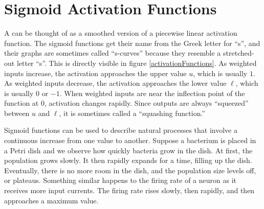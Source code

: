 \section{Sigmoid Activation Functions}


A  can be thought of as a smoothed version of a piecewise linear activation function. The sigmoid functions get their name from the Greek letter for ``s'', and their graphs are sometimes called ``s-curves'' because they resemble a stretched-out letter ``s''. This is directly visible in figure \ref{activationFunctions}. As weighted inputs increase, the activation approaches the upper value $u$, which is usually $1$. As weighted inputs decrease, the activation approaches the lower value $\ell$, which is usually $0$ or $-1$. When weighted inputs are near the inflection point of the function at 0, activation changes rapidly. Since outputs are always ``squeezed'' between $u$ and $\ell$, it is sometimes called a ``squashing function.''

  Sigmoid functions can be used to describe natural processes that involve a continuous increase from one value to another. Suppose a bacterium is placed in a Petri dish and we observe how quickly bacteria grow in the dish. At first, the population grows slowly. It then rapidly expands for a time, filling up the dish. Eventually, there is no more room in the dish, and the population size levels off, or plateaus. Something similar happens to the firing rate of a neuron as it receives more input currents. The firing rate rises slowly, then rapidly, and then approaches a maximum value.

